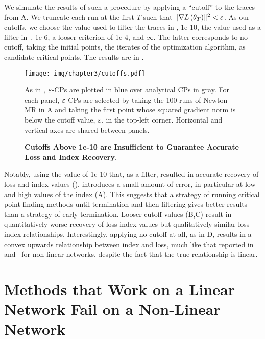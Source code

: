 \documentclass[../../thesis.tex]{subfiles}
\begin{document}
We simulate the results of such a procedure
by applying a \enquote{cutoff}
to the traces from A.
We truncate each run at the first $T$ such that
$\lVert\nabla L\left(\theta_T\right)\rVert^2 < \varepsilon$.
As our cutoffs,
we choose the value used to filter the traces in
, 1e-10,
the value used as a filter in~\cite{pennington2017}, 1e-6,
a looser criterion of 1e-4,
and $\infty$.
The latter corresponds to no cutoff,
taking the initial points,
the iterates of the optimization algorithm,
as candidate critical points.
The results are in .

\begin{figure}[h]
	\begin{center}
		\texttt{[image: img/chapter3/cutoffs.pdf]}
	\end{center}
	\caption{\textbf{Cutoffs Above 1e-10 are Insufficient to Guarantee
	Accurate Loss and Index Recovery}.}{%
	As in ,
	$\varepsilon$-CPs are plotted in blue
	over analytical CPs in gray.
	For each panel,
	$\varepsilon$-CPs are selected by taking
	the 100 runs of Newton-MR in A
	and taking the first point whose squared gradient norm is below
	the cutoff value, $\varepsilon$, in the top-left corner.
	Horizontal and vertical axes are shared between panels.
}
\end{figure}

Notably, using the value of 1e-10
that, as a filter,
resulted in accurate recovery of loss and index values
(),
introduces a small amount of error,
in particular at low and high values of the index
(A).
This suggests that
a strategy of running
critical point-finding methods until termination
and then filtering
gives better results than
a strategy of early termination.
Looser cutoff values
(B,C)
result in quantitatively worse
recovery of loss-index values
but qualitatively similar loss-index relationships.
Interestingly, applying no cutoff at all,
as in D,
results in a convex upwards relationship
between index and loss,
much like that reported in~\cite{dauphin2014} and~\cite{pennington2017}
for non-linear networks,
despite the fact that the true relationship is linear.


\section{Methods that Work on a Linear Network Fail on a Non-Linear Network}%
\end{document}
